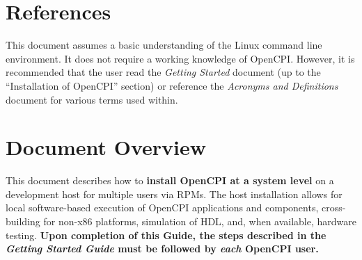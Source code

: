 \section{References}
This document assumes a basic understanding of the Linux command line environment. It does not require a working knowledge of OpenCPI. However, it is recommended that the user read the \textit{Getting Started} document (up to the ``Installation of OpenCPI'' section) or reference the \textit{Acronyms and Definitions} document for various terms used within.
\def\refskipig{} %
\def\myreferences{
\hline
Installation Guide\footnote{The RPM installation process is quite different from the process explained in the OpenCPI Installation Guide, but the OpenCPI Installation guide has applicable post-installation information for PCI-based boards, etc.} &
\githubio{OpenCPI\_Installation.pdf} \\
\hline
Component Development Guide &
\githubio{OpenCPI\_Component\_Development.pdf} \\
\hline
RCC Development Guide &
\githubio{OpenCPI\_RCC\_Development.pdf} \\
\hline
HDL Development Guide &
\githubio{OpenCPI\_HDL\_Development.pdf} \\
\hline
FPGA Vendor Tools Installation Guide &
\githubio{FPGA\_Vendor\_Tools\_Installation\_Guide.pdf} \\
\hline
Managing Software with \texttt{yum} (Fedora Project) &
\url{https://docs.fedoraproject.org/en-US/Fedora_Core/5/html/Software_Management_Guide/sn-managing-packages.html} \\
\hline
RHEL6 Deployment Guide: Useful \texttt{yum} commands (\textit{e.g.} \texttt{yum localinstall}; Red Hat) &
\url{https://access.redhat.com/documentation/en-us/red_hat_enterprise_linux/6/html/deployment_guide/ch-yum} \\
}

\newpage
\section{Document Overview}
\label{sec:doc_overview}
This document describes how to \textbf{install OpenCPI at a system level} on a development host for multiple users via RPMs. The host installation allows for local software-based execution of OpenCPI applications and components, cross-building for non-x86 platforms, simulation of HDL, and, when available, hardware testing. \textbf{Upon completion of this Guide, the steps described in the \textit{Getting Started Guide} must be followed by \textit{each} OpenCPI user.}\\

